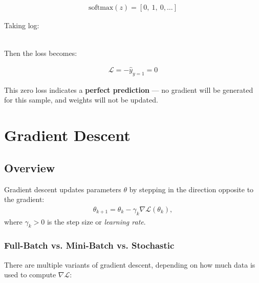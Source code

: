 \begin{align}
	\text{softmax}(z) = [0,\ 1,\ 0,\dots]
\end{align}

Taking log:

\begin{align}
	[-\infty,\ 0,\ -\infty,\dots]
\end{align}

Then the loss becomes:

\begin{align}
	\mathcal{L} = -\hat{y}_{y=1} = 0
\end{align}

This zero loss indicates a \textbf{perfect prediction} — no gradient will be generated for this sample, and weights will not be updated.


\section{Gradient Descent}

\subsection{Overview}
Gradient descent updates parameters $\theta$ by stepping in the direction opposite to the gradient:
\begin{align}
	\theta_{k+1} = \theta_k - \gamma_k \nabla \mathcal{L}(\theta_k),
\end{align}
where $\gamma_k > 0$ is the step size or \textit{learning rate}.

\subsubsection*{Full-Batch vs. Mini-Batch vs. Stochastic}

There are multiple variants of gradient descent, depending on how much data is used to compute $\nabla \mathcal{L}$:

